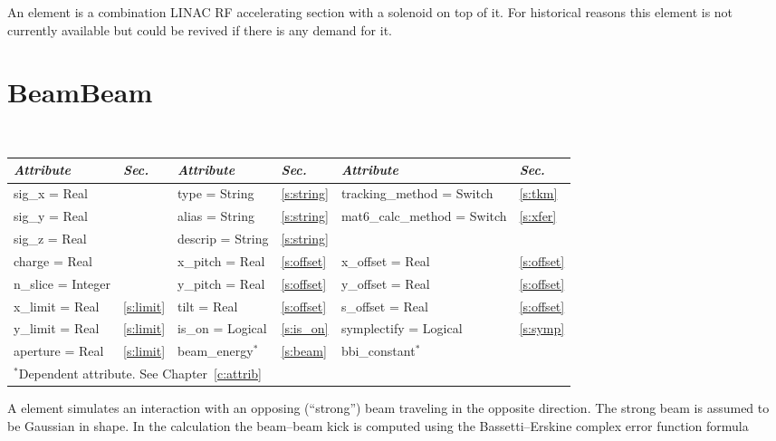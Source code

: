 An  element is a combination LINAC RF accelerating
section with a solenoid on top of it. For historical reasons this
element is not currently available but could be revived if there is
any demand for it.

\section{BeamBeam}
\label{s:bbi}

\begin{center} 
\tt
\begin{tabular}{|l|l||l|l||l|l|} \hline
  {\sl Attribute} & {\sl Sec.}  & {\sl Attribute} & {\sl Sec.} & {\sl Attribute} & {\sl Sec.} \\ \hline
  sig\_x   = Real       &                 & type = String    & \ref{s:string} & tracking\_method = Switch    & \ref{s:tkm}    \\ \hline
  sig\_y   = Real       &                 & alias = String   & \ref{s:string} & mat6\_calc\_method = Switch  & \ref{s:xfer}   \\ \hline
  sig\_z   = Real       &                 & descrip = String & \ref{s:string} &                              &                \\ \hline
  charge   = Real       &                 & x\_pitch = Real  & \ref{s:offset} & x\_offset  = Real            & \ref{s:offset} \\ \hline
  n\_slice = Integer    &                 & y\_pitch = Real  & \ref{s:offset} & y\_offset  = Real            & \ref{s:offset} \\ \hline
  x\_limit = Real       & \ref{s:limit}   & tilt = Real      & \ref{s:offset} & s\_offset  = Real            & \ref{s:offset} \\ \hline
  y\_limit = Real       & \ref{s:limit}   & is\_on = Logical & \ref{s:is_on}  & symplectify = Logical        & \ref{s:symp}   \\ \hline
  aperture = Real       & \ref{s:limit}   & beam\_energy$^*$ & \ref{s:beam}   & bbi\_constant$^*$            &                \\ \hline
  \multicolumn{6}{l}{\small $^*$Dependent attribute. See Chapter~\ref{c:attrib}} \\
\end{tabular}
\end{center}
\toffset

A  element simulates an interaction with an opposing
(``strong'') beam traveling in the opposite direction. The strong beam
is assumed to be Gaussian in shape. In the 
calculation the beam--beam kick is computed using the
Bassetti--Erskine complex error function formula\cite{b:talman}

